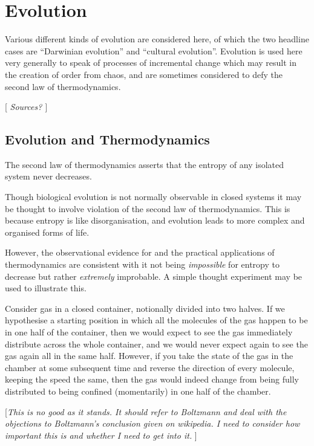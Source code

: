 \chapter{Evolution}

Various different kinds of evolution are considered here, of which the two headline cases are ``Darwinian evolution'' and ``cultural evolution''.
Evolution is used here very generally to speak of processes of incremental change which may result in the creation of order from chaos, and are sometimes considered to defy the second law of thermodynamics.

[{\it
Sources? \cite{BloomBRAIN}
}]
\section{Evolution and Thermodynamics}

The second law of thermodynamics  asserts that the entropy of any isolated system never decreases.

Though biological evolution is not normally observable in closed systems it may be thought to involve violation of the second law of thermodynamics.
This is because entropy is like disorganisation, and evolution leads to more complex and organised forms of life.

However, the observational evidence for and the practical applications of thermodynamics are consistent with it not being {\it impossible} for entropy to decrease but rather {\it extremely} improbable.
A simple thought experiment may be used to illustrate this.

Consider gas in a closed container, notionally divided into two halves.
If we hypothesise a starting position in which all the molecules of the gas happen to be in one half of the container, then we would expect to see the gas immediately distribute across the whole container, and we would never expect again to see the gas again all in the same half.
However, if you take the state of the gas in the chamber at some subsequent time and reverse the direction of every molecule, keeping the speed the same, then the gas would indeed change from being fully distributed to being confined (momentarily) in one half of the chamber.

[{\it This is no good as it stands. It should refer to Boltzmann and deal with the objections to Boltzmann's conclusion given on wikipedia.
I need to consider how important this is and whether I need to get into it.
}]

